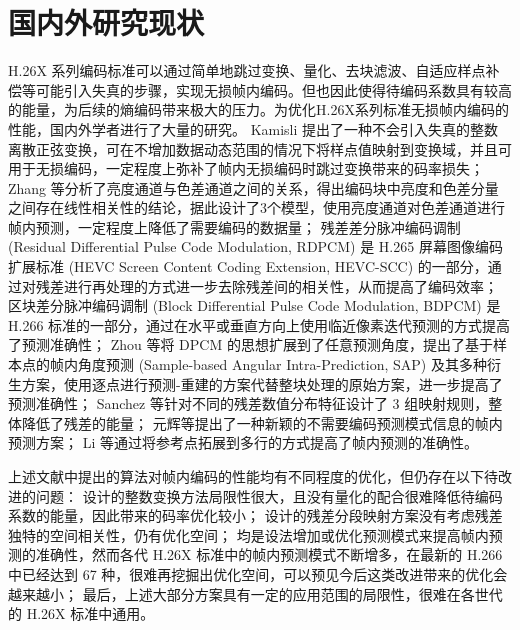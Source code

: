 \section{国内外研究现状}
H.26X 系列编码标准可以通过简单地跳过变换、量化、去块滤波、自适应样点补偿等可能引入失真的步骤，实现无损帧内编码。但也因此使得待编码系数具有较高的能量，为后续的熵编码带来极大的压力。为优化H.26X系列标准无损帧内编码的性能，国内外学者进行了大量的研究。
Kamisli 提出了一种不会引入失真的整数离散正弦变换，可在不增加数据动态范围的情况下将样点值映射到变换域，并且可用于无损编码，一定程度上弥补了帧内无损编码时跳过变换带来的码率损失；
Zhang 等分析了亮度通道与色差通道之间的关系，得出编码块中亮度和色差分量之间存在线性相关性的结论，据此设计了3个模型，使用亮度通道对色差通道进行帧内预测，一定程度上降低了需要编码的数据量；
残差差分脉冲编码调制 (Residual Differential Pulse Code Modulation, RDPCM) 是 H.265 屏幕图像编码扩展标准 (HEVC Screen Content Coding Extension, HEVC-SCC) 的一部分，通过对残差进行再处理的方式进一步去除残差间的相关性，从而提高了编码效率；
区块差分脉冲编码调制 (Block Differential Pulse Code Modulation, BDPCM) 是 H.266 标准的一部分，通过在水平或垂直方向上使用临近像素迭代预测的方式提高了预测准确性；
Zhou 等将 DPCM 的思想扩展到了任意预测角度，提出了基于样本点的帧内角度预测 (Sample-based Angular Intra-Prediction, SAP) 及其多种衍生方案，使用逐点进行预测-重建的方案代替整块处理的原始方案，进一步提高了预测准确性；
Sanchez 等针对不同的残差数值分布特征设计了 3 组映射规则，整体降低了残差的能量；
元辉等提出了一种新颖的不需要编码预测模式信息的帧内预测方案；
Li 等通过将参考点拓展到多行的方式提高了帧内预测的准确性。

上述文献中提出的算法对帧内编码的性能均有不同程度的优化，但仍存在以下待改进的问题：
\cite{LosslessI2ITransformTCSVT} 设计的整数变换方法局限性很大，且没有量化的配合很难降低待编码系数的能量，因此带来的码率优化较小；
\cite{pwmResidualsPiecewiseMapping,HEVCSCCOverview} 设计的残差分段映射方案没有考虑残差独特的空间相关性，仍有优化空间；
\cite{CrossComponentPredictionCCLM,SAP-SAPE,SAP-SAP1,SAP-SAPHVSWP2DTM,SAP-SAPHV,SAP-SAP,XiDianIntraPredictionH264,EfficientMultiplelinebasedIntra} 均是设法增加或优化预测模式来提高帧内预测的准确性，然而各代 H.26X 标准中的帧内预测模式不断增多，在最新的 H.266 中已经达到 67 种，很难再挖掘出优化空间，可以预见今后这类改进带来的优化会越来越小；
最后，上述大部分方案具有一定的应用范围的局限性，很难在各世代的 H.26X 标准中通用。

